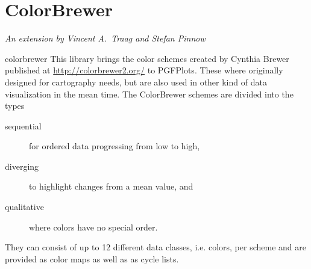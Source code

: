 {{%
}}

\section{ColorBrewer}
\def\pgfplotsmanualcurlibrary{colormaps}

{\emph{An extension by Vincent A.\ Traag and Stefan Pinnow}}

\begin{pgfplotslibrary}{colorbrewer}
This library brings the color schemes created by Cynthia Brewer published at
\url{http://colorbrewer2.org/} to PGFPlots. These where originally designed for
cartography needs, but are also used in other kind of data visualization in the
mean time. The ColorBrewer schemes are divided into the types
%
\begin{description}
    \item[sequential] for ordered data progressing from low to high,
    \item[diverging] to highlight changes from a mean value, and
    \item[qualitative] where colors have no special order.
\end{description}
%
They can consist of up to 12 different data classes, i.e. colors, per scheme
and are provided as color maps as well as as cycle lists.

{%
\centering

}
\end{pgfplotslibrary}
